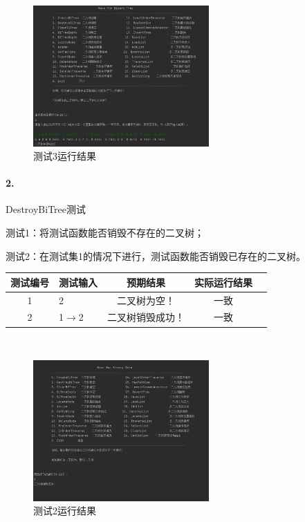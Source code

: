 \documentclass[supercite]{Experimental_Report}
\theoremstyle{definition}
\begin{document}
 \begin{figure}[H]
 	\centering
 	\includegraphics[width=0.6\textwidth]{images/二叉树测试1.png}
 	\caption{测试3运行结果}
 	\label{txlab}
 \end{figure}

\paragraph{ 2.}DestroyBiTree测试

测试1：将测试函数能否销毁不存在的二叉树；

测试2：在测试集1的情况下进行，测试函数能否销毁已存在的二叉树。

\vspace{0.5em}

\begin{tabular}{|c|l|c|c|c|}
	\hline
	测试编号 & 测试输入 & 预期结果 & 实际运行结果 \\
	\hline
	1 & 2 & 二叉树为空！ & 一致 \\
	\hline
	2 & 1$\rightarrow$2 & 二叉树销毁成功！ & 一致 \\
	\hline
\end{tabular}

~\

\begin{figure}[H]
 	\centering
 	\includegraphics[width=0.6\textwidth]{images/二叉树测试2.png}
 	\caption{测试2运行结果}
 	\label{txlab}
 \end{figure}
\end{document}
